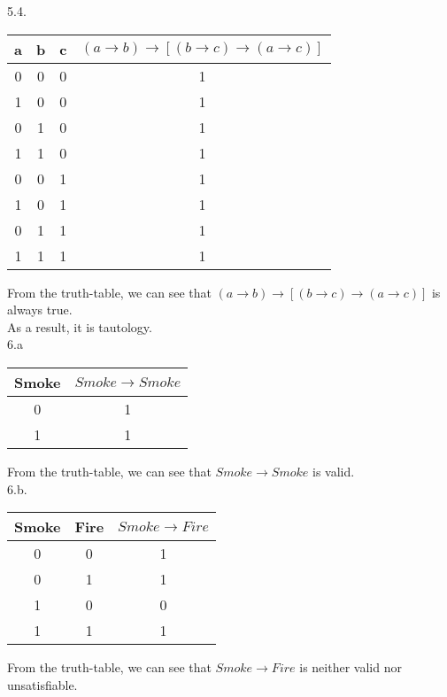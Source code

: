 \documentclass[a4paper]{article}
\begin{document}
5.4.\\
\begin{table}[!htb]
\centering
\begin{tabular}{|c|c|c|c|}
\hline
a & b & c & $(a \rightarrow b) \rightarrow [(b \rightarrow c) \rightarrow (a \rightarrow c)]$ \\ \hline
0 & 0 & 0 & 1 \\ \hline
1 & 0 & 0 & 1 \\ \hline
0 & 1 & 0 & 1 \\ \hline
1 & 1 & 0 & 1 \\ \hline
0 & 0 & 1 & 1 \\ \hline
1 & 0 & 1 & 1 \\ \hline
0 & 1 & 1 & 1 \\ \hline
1 & 1 & 1 & 1 \\ \hline
\end{tabular}
\end{table}
From the truth-table, we can see that $(a \rightarrow b) \rightarrow [(b \rightarrow c) \rightarrow (a \rightarrow c)]$ is always true. \\
As a result, it is tautology.\\

6.a\\
\begin{table}[!htb]
\centering
\begin{tabular}{|c|c|}
\hline
Smoke & $Smoke \rightarrow Smoke$ \\ \hline
0 & 1 \\ \hline
1 & 1 \\ \hline
\end{tabular}
\end{table}
From the truth-table, we can see that $Smoke \rightarrow Smoke$ is valid. \\

6.b.\\
\begin{table}[!htb]
\centering
\begin{tabular}{|c|c|c|}
\hline
Smoke & Fire & $Smoke \rightarrow Fire$ \\ \hline
 0 & 0 & 1 \\ \hline
 0 & 1 & 1 \\ \hline
 1 & 0 & 0 \\ \hline
 1 & 1 & 1 \\ \hline
\end{tabular}
\end{table}
From the truth-table, we can see that $Smoke \rightarrow Fire$ is neither valid nor unsatisfiable.\\
\end{document}
